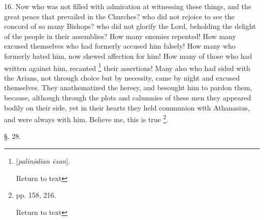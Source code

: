 16. Now who was not filled with admiration at
witnessing these things, and the great peace that prevailed in the
Churches? who did not rejoice to see the concord of so many Bishops?
who did not glorify the Lord, beholding the delight of the people in
their assemblies? How many enemies repented! How many excused
themselves who had formerly accused him falsely! How many who formerly
hated him, now shewed affection for him! How many of those who had
written against him, recanted \footnote{[\emph{palin\={o}dian \={e}san}].

Return to text} their assertions! Many also who had sided with the Arians, not
through choice but by necessity, came by night and excused themselves.
They anathematized the heresy, and besought him to pardon them,
because, although through the plots and calumnies of these men they
appeared bodily on their side, yet in their hearts they held communion
with Athanasius, and were always with him. Believe me, this is true \footnote{pp. 158, 216.

Return to text}.


§. 28.

